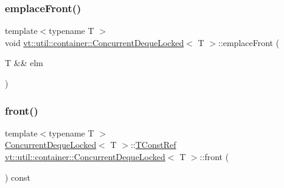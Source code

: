 \mbox{\label{structvt_1_1util_1_1container_1_1_concurrent_deque_locked_a5f5007fed6eaa4d42d1877a0d8b096c9}} 
\subsubsection{\texorpdfstring{emplace\+Front()}{emplaceFront()}}
{\footnotesize\ttfamily template$<$typename T $>$ \\
void \hyperlink{structvt_1_1util_1_1container_1_1_concurrent_deque_locked}{vt\+::util\+::container\+::\+Concurrent\+Deque\+Locked}$<$ T $>$\+::emplace\+Front (\begin{DoxyParamCaption}\item[{T \&\&}]{elm }\end{DoxyParamCaption})}

\mbox{\label{structvt_1_1util_1_1container_1_1_concurrent_deque_locked_a57af0c7ac85e7bb3922bb839b666c1e7}} 
\subsubsection{\texorpdfstring{front()}{front()}\hspace{0.1cm}{\footnotesize\ttfamily [1/2]}}
{\footnotesize\ttfamily template$<$typename T $>$ \\
\hyperlink{structvt_1_1util_1_1container_1_1_concurrent_deque_locked}{Concurrent\+Deque\+Locked}$<$ T $>$\+::\hyperlink{structvt_1_1util_1_1container_1_1_concurrent_deque_locked_a9da9776dff836c013a95431f3ab15e35}{T\+Const\+Ref} \hyperlink{structvt_1_1util_1_1container_1_1_concurrent_deque_locked}{vt\+::util\+::container\+::\+Concurrent\+Deque\+Locked}$<$ T $>$\+::front (\begin{DoxyParamCaption}{ }\end{DoxyParamCaption}) const}


